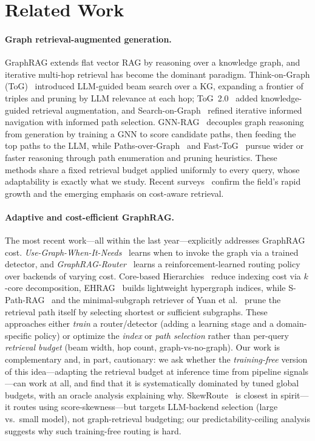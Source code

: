 \section{Related Work}
\label{sec:related}

\paragraph{Graph retrieval-augmented generation.}
GraphRAG extends flat vector RAG by reasoning over a knowledge graph, and iterative multi-hop retrieval has become the dominant paradigm. Think-on-Graph (ToG)~\cite{sun2023thinkongraph} introduced LLM-guided beam search over a KG, expanding a frontier of triples and pruning by LLM relevance at each hop; ToG~2.0~\cite{ma2024thinkongraph} added knowledge-guided retrieval augmentation, and Search-on-Graph~\cite{sun2025searchongraph} refined iterative informed navigation with informed path selection. GNN-RAG~\cite{mavromatis2025gnnrag} decouples graph reasoning from generation by training a GNN to score candidate paths, then feeding the top paths to the LLM, while Paths-over-Graph~\cite{tan2025pathsovergraph} and Fast-ToG~\cite{liang2025fast} pursue wider or faster reasoning through path enumeration and pruning heuristics. These methods share a fixed retrieval budget applied uniformly to every query, whose adaptability is exactly what we study. Recent surveys~\cite{peng2024graph,zhang2025survey,huang2026survey} confirm the field's rapid growth and the emerging emphasis on cost-aware retrieval.

\paragraph{Adaptive and cost-efficient GraphRAG.}
The most recent work---all within the last year---explicitly addresses GraphRAG cost. \emph{Use-Graph-When-It-Needs}~\cite{dong2026graph} learns when to invoke the graph via a trained detector, and \emph{GraphRAG-Router}~\cite{fan2026graphragrouter} learns a reinforcement-learned routing policy over backends of varying cost. Core-based Hierarchies~\cite{hossain2026corebased} reduce indexing cost via $k$-core decomposition, EHRAG~\cite{song2026ehrag} builds lightweight hypergraph indices, while S-Path-RAG~\cite{fu2026spathrag} and the minimal-subgraph retriever of Yuan et al.~\cite{yuan2026retrieving} prune the retrieval path itself by selecting shortest or sufficient subgraphs. These approaches either \emph{train} a router/detector (adding a learning stage and a domain-specific policy) or optimize the \emph{index} or \emph{path selection} rather than per-query \emph{retrieval budget} (beam width, hop count, graph-vs-no-graph). Our work is complementary and, in part, cautionary: we ask whether the \emph{training-free} version of this idea---adapting the retrieval budget at inference time from pipeline signals---can work at all, and find that it is systematically dominated by tuned global budgets, with an oracle analysis explaining why. SkewRoute~\cite{wang2025skewroute} is closest in spirit---it routes using score-skewness---but targets LLM-backend selection (large vs.\ small model), not graph-retrieval budgeting; our predictability-ceiling analysis suggests why such training-free routing is hard.

